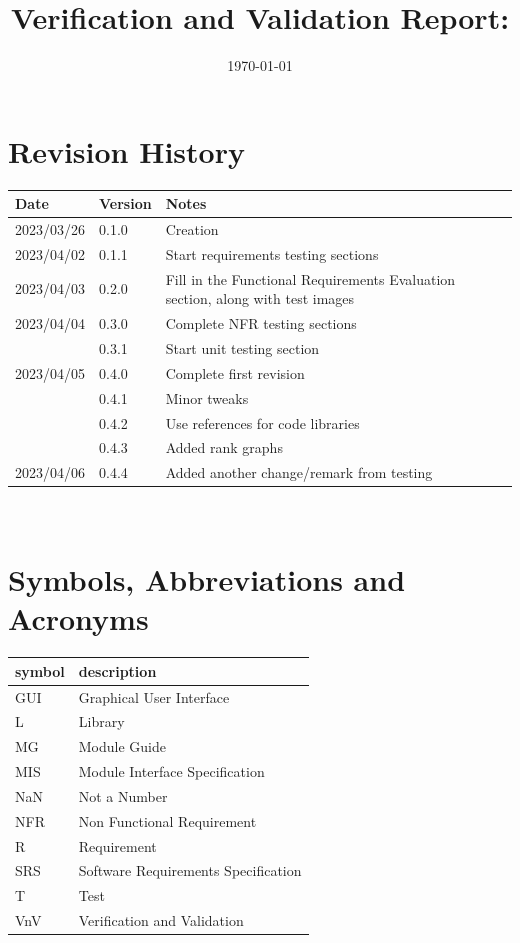 \documentclass[12pt, titlepage]{article}
\begin{document}
\title{Verification and Validation Report: \progname} 
\author{\authname}
\date{\today}
	
\maketitle


\section{Revision History}

\begin{tabularx}{\textwidth}{p{3cm}p{2cm}X}
\toprule {\bf Date} & {\bf Version} & {\bf Notes}\\
\midrule
2023/03/26 & 0.1.0 & Creation\\
2023/04/02 & 0.1.1 & Start requirements testing sections\\
2023/04/03 & 0.2.0 & Fill in the Functional Requirements Evaluation
  section, along with test images\\
2023/04/04 & 0.3.0 & Complete NFR testing sections\\
           & 0.3.1 & Start unit testing section\\
2023/04/05 & 0.4.0 & Complete first revision\\
           & 0.4.1 & Minor tweaks\\
           & 0.4.2 & Use references for code libraries\\
           & 0.4.3 & Added rank graphs\\
2023/04/06 & 0.4.4 & Added another change/remark from testing\\
\bottomrule
\end{tabularx}

~\newpage

\section{Symbols, Abbreviations and Acronyms}

\renewcommand{\arraystretch}{1.2}
\begin{tabular}{l l} 
  \toprule		
  \textbf{symbol} & \textbf{description}\\
  \midrule 
  GUI & Graphical User Interface\\
  L & Library\\
  MG & Module Guide\\
  MIS & Module Interface Specification\\
  NaN & Not a Number\\
  NFR & Non Functional Requirement\\
  R & Requirement\\
  SRS & Software Requirements Specification\\
  T & Test\\
  VnV & Verification and Validation\\
  \bottomrule
\end{tabular}\\
\end{document}
